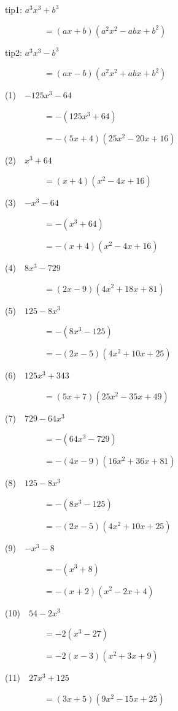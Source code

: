 \documentclass[a4j,twocolumn,10pt,fleqn]{jarticle}
\begin{document}
tip1: $a^{3} x^{3} + b^{3}$

~~~~~~~~~$=\left(a x + b\right) \left(a^{2} x^{2} - a b x + b^{2}\right)$


tip2: $a^{3} x^{3} - b^{3}$

~~~~~~~~~$=\left(a x - b\right) \left(a^{2} x^{2} + a b x + b^{2}\right)$


(1)~~$- 125 x^{3} - 64$

~~~~~~~~~$=-(125 x^{3} + 64)$

~~~~~~~~~$=-\left(5 x + 4\right) \left(25 x^{2} - 20 x + 16\right)$

(2)~~$x^{3} + 64$

~~~~~~~~~$=\left(x + 4\right) \left(x^{2} - 4 x + 16\right)$

(3)~~$- x^{3} - 64$

~~~~~~~~~$=-(x^{3} + 64)$

~~~~~~~~~$=-\left(x + 4\right) \left(x^{2} - 4 x + 16\right)$

(4)~~$8 x^{3} - 729$

~~~~~~~~~$=\left(2 x - 9\right) \left(4 x^{2} + 18 x + 81\right)$

(5)~~$125 - 8 x^{3}$

~~~~~~~~~$=-(8 x^{3} - 125)$

~~~~~~~~~$=-\left(2 x - 5\right) \left(4 x^{2} + 10 x + 25\right)$

(6)~~$125 x^{3} + 343$

~~~~~~~~~$=\left(5 x + 7\right) \left(25 x^{2} - 35 x + 49\right)$

(7)~~$729 - 64 x^{3}$

~~~~~~~~~$=-(64 x^{3} - 729)$

~~~~~~~~~$=-\left(4 x - 9\right) \left(16 x^{2} + 36 x + 81\right)$

(8)~~$125 - 8 x^{3}$

~~~~~~~~~$=-(8 x^{3} - 125)$

~~~~~~~~~$=-\left(2 x - 5\right) \left(4 x^{2} + 10 x + 25\right)$

(9)~~$- x^{3} - 8$

~~~~~~~~~$=-(x^{3} + 8)$

~~~~~~~~~$=-\left(x + 2\right) \left(x^{2} - 2 x + 4\right)$

(10)~~$54 - 2 x^{3}$

~~~~~~~~~$=-2(x^{3} - 27)$

~~~~~~~~~$=-2\left(x - 3\right) \left(x^{2} + 3 x + 9\right)$

(11)~~$27 x^{3} + 125$

~~~~~~~~~$=\left(3 x + 5\right) \left(9 x^{2} - 15 x + 25\right)$
\end{document}

